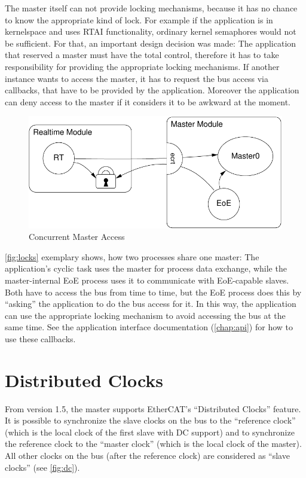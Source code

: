 \documentclass[a4paper,12pt,BCOR6mm,bibtotoc,idxtotoc]{scrbook}
\begin{document}
The master itself can not provide locking mechanisms, because it has no chance
to know the appropriate kind of lock. For example if the application is in
kernelspace and uses RTAI functionality, ordinary kernel semaphores would not
be sufficient. For that, an important design decision was made: The
application that reserved a master must have the total control, therefore it
has to take responsibility for providing the appropriate locking mechanisms.
If another instance wants to access the master, it has to request the bus
access via callbacks, that have to be provided by the application. Moreover
the application can deny access to the master if it considers it to be awkward
at the moment.

\begin{figure}[htbp]
  \centering
  \includegraphics[width=.6\textwidth]{images/master-locks}
  \caption{Concurrent Master Access}
  \label{fig:locks}
\end{figure}

\autoref{fig:locks} exemplary shows, how two processes share one master:
The application's cyclic task uses the master for process data exchange, while
the master-internal EoE process uses it to communicate with EoE-capable
slaves. Both have to access the bus from time to time, but the EoE process
does this by ``asking'' the application to do the bus access for it. In this
way, the application can use the appropriate locking mechanism to avoid
accessing the bus at the same time. See the application interface
documentation (\autoref{chap:api}) for how to use these callbacks.


\section{Distributed Clocks}
\label{sec:dc}

From version 1.5, the master supports EtherCAT's ``Distributed Clocks''
feature. It is possible to synchronize the slave clocks on the bus to the
``reference clock'' (which is the local clock of the first slave with DC
support) and to synchronize the reference clock to the ``master clock'' (which
is the local clock of the master). All other clocks on the bus (after the
reference clock) are considered as ``slave clocks'' (see \autoref{fig:dc}).
\end{document}
